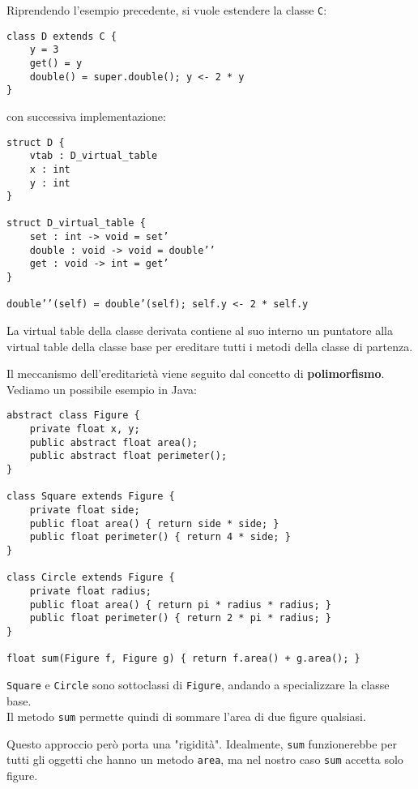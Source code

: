 \documentclass{article}
\begin{document}
Riprendendo l'esempio precedente, si vuole estendere la classe \texttt{C}:
\begin{tcolorbox}
\begin{verbatim}
class D extends C {
    y = 3
    get() = y
    double() = super.double(); y <- 2 * y
}
\end{verbatim}
\end{tcolorbox}
con successiva implementazione:
\begin{tcolorbox}
\begin{verbatim}
struct D {
    vtab : D_virtual_table
    x : int
    y : int
}

struct D_virtual_table {
    set : int -> void = set’
    double : void -> void = double’’
    get : void -> int = get’
}

double’’(self) = double’(self); self.y <- 2 * self.y
\end{verbatim}
\end{tcolorbox}
La virtual table della classe derivata contiene al suo interno un puntatore alla virtual table della classe base per ereditare tutti i metodi della classe di partenza.

\pagebreak

Il meccanismo dell'ereditarietà viene seguito dal concetto di \textbf{polimorfismo}. Vediamo un possibile esempio in Java:
\begin{tcolorbox}
\begin{verbatim}
abstract class Figure {
    private float x, y;
    public abstract float area();
    public abstract float perimeter();
}

class Square extends Figure {
    private float side;
    public float area() { return side * side; }
    public float perimeter() { return 4 * side; }
}

class Circle extends Figure {
    private float radius;
    public float area() { return pi * radius * radius; }
    public float perimeter() { return 2 * pi * radius; }
}

float sum(Figure f, Figure g) { return f.area() + g.area(); }
\end{verbatim}
\end{tcolorbox}
\texttt{Square} e \texttt{Circle} sono sottoclassi di \texttt{Figure}, andando a specializzare la classe base.\\
Il metodo \texttt{sum} permette quindi di sommare l'area di due figure qualsiasi.

Questo approccio però porta una "rigidità". Idealmente, \texttt{sum} funzionerebbe per tutti gli oggetti che hanno un metodo \texttt{area}, ma nel nostro caso \texttt{sum} accetta solo figure.
\end{document}
